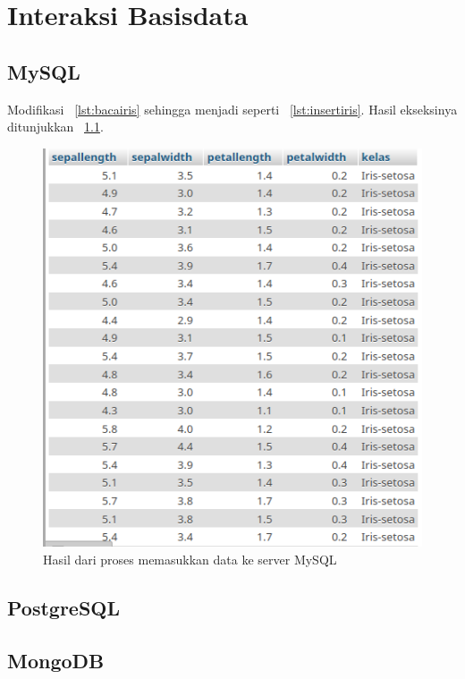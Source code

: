 \chapter{Interaksi Basisdata}
\section{MySQL}
Modifikasi \lstlistingname~\ref{lst:bacairis} sehingga menjadi seperti \lstlistingname~\ref{lst:insertiris}. Hasil ekseksinya ditunjukkan \figurename~\ref{fig:insertmysql}.
 
 

\begin{figure}
  \begin{center}
    \includegraphics[scale=2.0]{pics/insertmysql.png}
    \caption{Hasil dari proses memasukkan data ke server MySQL}
    \label{fig:insertmysql}
  \end{center}
\end{figure}
\section{PostgreSQL}
\section{MongoDB}
